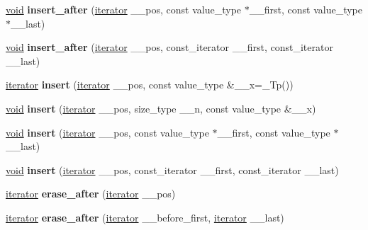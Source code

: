 \begin{DoxyCompactItemize}
\hyperlink{interfacevoid}{void} {\bfseries insert\+\_\+after} (\hyperlink{structiterator}{iterator} \+\_\+\+\_\+pos, const value\+\_\+type $\ast$\+\_\+\+\_\+first, const value\+\_\+type $\ast$\+\_\+\+\_\+last)
\item 
\mbox{\label{classslist_ac48f0ea37816ca850d418cd17400c275}} 
\hyperlink{interfacevoid}{void} {\bfseries insert\+\_\+after} (\hyperlink{structiterator}{iterator} \+\_\+\+\_\+pos, const\+\_\+iterator \+\_\+\+\_\+first, const\+\_\+iterator \+\_\+\+\_\+last)
\item 
\mbox{\label{classslist_a79a5f540bab58770914eacfb31246003}} 
\hyperlink{structiterator}{iterator} {\bfseries insert} (\hyperlink{structiterator}{iterator} \+\_\+\+\_\+pos, const value\+\_\+type \&\+\_\+\+\_\+x=\+\_\+\+Tp())
\item 
\mbox{\label{classslist_acc1b8600d4a9839c3465dc228bdbee2c}} 
\hyperlink{interfacevoid}{void} {\bfseries insert} (\hyperlink{structiterator}{iterator} \+\_\+\+\_\+pos, size\+\_\+type \+\_\+\+\_\+n, const value\+\_\+type \&\+\_\+\+\_\+x)
\item 
\mbox{\label{classslist_a33c00375362b8076a18f877c871bbc5f}} 
\hyperlink{interfacevoid}{void} {\bfseries insert} (\hyperlink{structiterator}{iterator} \+\_\+\+\_\+pos, const value\+\_\+type $\ast$\+\_\+\+\_\+first, const value\+\_\+type $\ast$\+\_\+\+\_\+last)
\item 
\mbox{\label{classslist_a0afd5a869869cd7062ec22f805b9d63f}} 
\hyperlink{interfacevoid}{void} {\bfseries insert} (\hyperlink{structiterator}{iterator} \+\_\+\+\_\+pos, const\+\_\+iterator \+\_\+\+\_\+first, const\+\_\+iterator \+\_\+\+\_\+last)
\item 
\mbox{\label{classslist_a935cbe6dae711ad6f9842686f8ea7258}} 
\hyperlink{structiterator}{iterator} {\bfseries erase\+\_\+after} (\hyperlink{structiterator}{iterator} \+\_\+\+\_\+pos)
\item 
\mbox{\label{classslist_a0f5c4ce0e472bd4687837b7693ce4127}} 
\hyperlink{structiterator}{iterator} {\bfseries erase\+\_\+after} (\hyperlink{structiterator}{iterator} \+\_\+\+\_\+before\+\_\+first, \hyperlink{structiterator}{iterator} \+\_\+\+\_\+last)
\item 

\end{DoxyCompactItemize}
